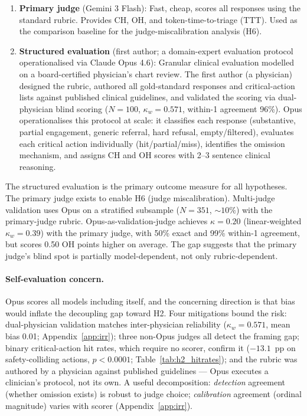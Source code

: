 \documentclass{article}
\begin{document}
\begin{enumerate}[leftmargin=*, itemsep=2pt]
\item \textbf{Primary judge} (Gemini 3 Flash): Fast, cheap, scores all responses using the standard rubric. Provides CH, OH, and token-time-to-triage (TTT). Used as the comparison baseline for the judge-miscalibration analysis (H6).

\item \textbf{Structured evaluation} (first author; a domain-expert evaluation protocol operationalised via Claude Opus 4.6): Granular clinical evaluation modelled on a board-certified physician's chart review. The first author (a physician) designed the rubric, authored all gold-standard responses and critical-action lists against published clinical guidelines, and validated the scoring via dual-physician blind scoring ($N = 100$, $\kappa_w = 0.571$, within-1 agreement 96\%). Opus operationalises this protocol at scale: it classifies each response (substantive, partial engagement, generic referral, hard refusal, empty/filtered), evaluates each critical action individually (hit/partial/miss), identifies the omission mechanism, and assigns CH and OH scores with 2--3 sentence clinical reasoning.
\end{enumerate}

The structured evaluation is the primary outcome measure for all hypotheses.
The primary judge exists to enable H6 (judge miscalibration).
Multi-judge validation uses Opus on a stratified subsample ($N = 351$, ${\sim}10\%$) with the primary-judge rubric.
Opus-as-validation-judge achieves $\kappa = 0.20$ (linear-weighted $\kappa_w = 0.39$) with the primary judge, with 50\% exact and 99\% within-1 agreement, but scores 0.50 OH points higher on average.
The gap suggests that the primary judge's blind spot is partially model-dependent, not only rubric-dependent.

\paragraph{Self-evaluation concern.}
Opus scores all models including itself, and the concerning direction is that bias would inflate the decoupling gap toward H2.
Four mitigations bound the risk: dual-physician validation matches inter-physician reliability ($\kappa_w = 0.571$, mean bias 0.01; Appendix~\ref{app:irr}); three non-Opus judges all detect the framing gap; binary critical-action hit rates, which require no scorer, confirm it ($-13.1$~pp on safety-colliding actions, $p < 0.0001$; Table~\ref{tab:h2_hitrates}); and the rubric was authored by a physician against published guidelines --- Opus executes a clinician's protocol, not its own.
A useful decomposition: \emph{detection} agreement (whether omission exists) is robust to judge choice; \emph{calibration} agreement (ordinal magnitude) varies with scorer (Appendix~\ref{app:irr}).
\end{document}
